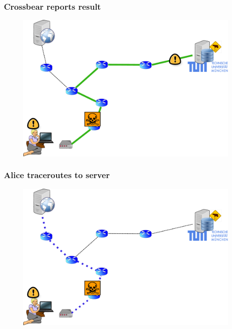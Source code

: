 \begin{frame}
  \frametitle{Crossbear reports result}
  \begin{block}{}
    \vskip -1.2cm
    \begin{figure}[t]
      \centering
      \includegraphics[scale=.36]{figures/reporting-5-feedback}
    \end{figure}
  \end{block}
\end{frame}


\begin{frame}
  \frametitle{Alice traceroutes to server}
  \begin{block}{}
    \vskip -1.1cm
    \begin{figure}[t]
      \centering
      \includegraphics[scale=.36]{figures/reporting-6-hunting}
    \end{figure}
  \end{block}
\end{frame}


